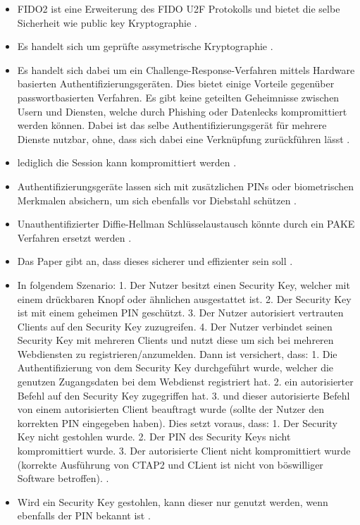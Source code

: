 \begin{itemize}
    \item FIDO2 ist eine Erweiterung des FIDO U2F Protokolls und bietet die selbe Sicherheit wie public key Kryptographie \cite{lyastani2020fido2}.
    \item Es handelt sich um geprüfte assymetrische Kryptographie \cite{farke2020you}.
    \item Es handelt sich dabei um ein Challenge-Response-Verfahren mittels Hardware basierten Authentifizierungsgeräten. Dies bietet einige Vorteile gegenüber passwortbasierten Verfahren. Es gibt keine geteilten Geheimnisse zwischen Usern und Diensten, welche durch Phishing oder Datenlecks kompromittiert werden können. Dabei ist das selbe Authentifizierungsgerät für mehrere Dienste nutzbar, ohne, dass sich dabei eine Verknüpfung zurückführen lässt \cite{lyastani2020fido2} \cite{farke2020you}.
    \item lediglich die Session kann kompromittiert werden \cite{morii2017research}.
    \item Authentifizierungsgeräte lassen sich mit zusätzlichen PINs oder biometrischen Merkmalen absichern, um sich ebenfalls vor Diebstahl schützen \cite{barbosa2021provable}.
    \item Unauthentifizierter Diffie-Hellman Schlüsselaustausch könnte durch ein \ac{PAKE} Verfahren ersetzt werden \cite{barbosa2021provable}.
    \item Das Paper gibt an, dass dieses sicherer und effizienter sein soll \cite{barbosa2021provable}.
    \item In folgendem Szenario: 1. Der Nutzer besitzt einen Security Key, welcher mit einem drückbaren Knopf oder ähnlichen ausgestattet ist. 2. Der Security Key ist mit einem geheimen PIN geschützt. 3. Der Nutzer autorisiert vertrauten Clients auf den Security Key zuzugreifen. 4. Der Nutzer verbindet seinen Security Key mit mehreren Clients und nutzt diese um sich bei mehreren Webdiensten zu registrieren/anzumelden.
    Dann ist versichert, dass:
    1. Die Authentifizierung von dem Security Key durchgeführt wurde, welcher die genutzen Zugangsdaten bei dem Webdienst registriert hat.
    2. ein autorisierter Befehl auf den Security Key zugegriffen hat.
    3. und dieser autorisierte Befehl von einem autorisierten Client beauftragt wurde (sollte der Nutzer den korrekten PIN eingegeben haben).
    Dies setzt voraus, dass:
    1. Der Security Key nicht gestohlen wurde.
    2. Der PIN des Security Keys nicht kompromittiert wurde.
    3. Der autorisierte Client nicht kompromittiert wurde (korrekte Ausführung von \ac{CTAP2} und CLient ist nicht von böswilliger Software betroffen).
    \cite{barbosa2021provable}.
    \item Wird ein Security Key gestohlen, kann dieser nur genutzt werden, wenn ebenfalls der PIN bekannt ist \cite{barbosa2021provable}.
\end{itemize}

